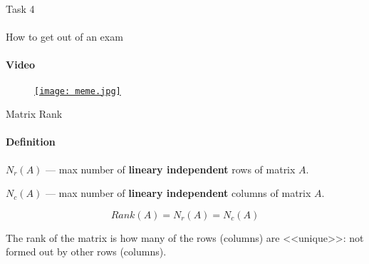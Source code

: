 \documentclass[aspectratio=169]{beamer}
\begin{document}
\begin{frame}[t]{Task 4}
    \framesubtitle{}
\end{frame}

\begin{frame}[t]{How to get out of an exam}
    \framesubtitle{Video}
    \vspace{-0.6cm}
    \begin{figure}[H]
        \href{https://vk.com/video13182781_162655656}{
            \centering\texttt{[image: meme.jpg]}}
        \label{fig:meme.jpg}
    \end{figure}
\end{frame}

\begin{frame}[t]{Matrix Rank}
    \framesubtitle{Definition}
        \textbf{$N_r(A)$} --- max number of \textbf{lineary independent} rows of matrix $A$.
    
        \textbf{$N_c(A)$} --- max number of \textbf{lineary independent} columns of matrix $A$.
    
        \begin{equation*}
            Rank(A) = N_r(A) = N_c(A)
        \end{equation*}
    \bigskip
    
        \centering
        The rank of the matrix is how many of the rows (columns) are <<unique>>: not formed out by other rows (columns).
    \end{frame}
    
\end{document}
